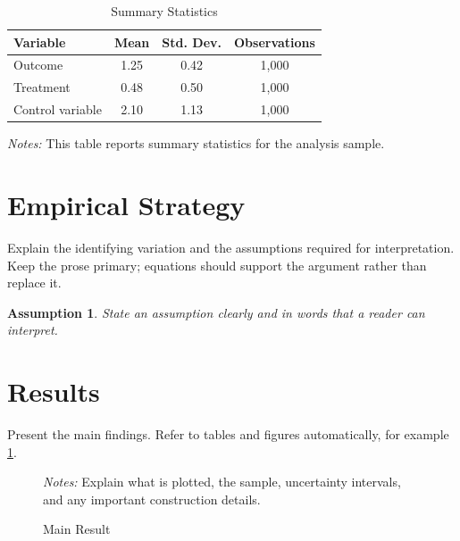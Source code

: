 \documentclass[11pt]{article}
\newtheorem{assumption}{Assumption}
\begin{document}
\begin{table}[htbp]
\centering
\caption{Summary Statistics}\label{tab:summary}
\begin{threeparttable}
\begin{tabular}{lccc}
\toprule
Variable & Mean & Std. Dev. & Observations \\
\midrule
Outcome & 1.25 & 0.42 & 1,000 \\
Treatment & 0.48 & 0.50 & 1,000 \\
Control variable & 2.10 & 1.13 & 1,000 \\
\bottomrule
\end{tabular}
\begin{tablenotes}[flushleft]
\footnotesize
\item \textit{Notes:} This table reports summary statistics for the analysis sample.
\end{tablenotes}
\end{threeparttable}
\end{table}

\section{Empirical Strategy}\label{sec:strategy}
Explain the identifying variation and the assumptions required for interpretation. Keep the prose primary; equations should support the argument rather than replace it.

\begin{assumption}\label{assump:example}
State an assumption clearly and in words that a reader can interpret.
\end{assumption}

\section{Results}\label{sec:results}
Present the main findings. Refer to tables and figures automatically, for example \cref{tab:summary}.

\begin{figure}[htbp]
\centering
\fbox{\rule{0pt}{2in}\rule{0.75\linewidth}{0pt}}
\caption{Main Result}\label{fig:main}
\begin{minipage}{0.85\linewidth}
\footnotesize
\textit{Notes:} Explain what is plotted, the sample, uncertainty intervals, and any important construction details.
\end{minipage}
\end{figure}
\end{document}
